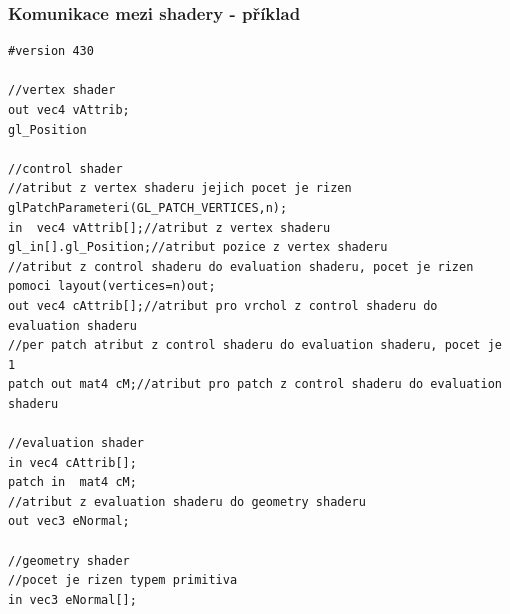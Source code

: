 \begin{frame}[fragile]
\frametitle{Komunikace mezi shadery - příklad}
	{\tiny
	\begin{verbatim}
#version 430

//vertex shader
out vec4 vAttrib;
gl_Position

//control shader
//atribut z vertex shaderu jejich pocet je rizen glPatchParameteri(GL_PATCH_VERTICES,n);
in  vec4 vAttrib[];//atribut z vertex shaderu
gl_in[].gl_Position;//atribut pozice z vertex shaderu
//atribut z control shaderu do evaluation shaderu, pocet je rizen pomoci layout(vertices=n)out;
out vec4 cAttrib[];//atribut pro vrchol z control shaderu do evaluation shaderu
//per patch atribut z control shaderu do evaluation shaderu, pocet je 1
patch out mat4 cM;//atribut pro patch z control shaderu do evaluation shaderu

//evaluation shader
in vec4 cAttrib[];
patch in  mat4 cM;
//atribut z evaluation shaderu do geometry shaderu
out vec3 eNormal;

//geometry shader
//pocet je rizen typem primitiva
in vec3 eNormal[];
	\end{verbatim}
	}
\end{frame}

